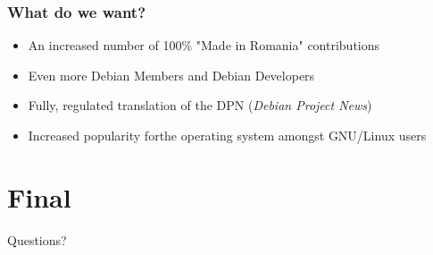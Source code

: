 \documentclass[xcolor=dvipsnames]{beamer}
\begin{document}
\begin{frame}
\frametitle{What do we want?}
\begin{itemize}
\item An increased number of 100\% "Made in Romania" contributions
\item Even more Debian Members and Debian Developers
\item Fully, regulated translation of the DPN (\emph{Debian Project News})
\item Increased popularity forthe operating system amongst GNU/Linux users
\end{itemize}
\end{frame}


\section{Final} 
\begin{frame}
\centerline{Questions?}
\end{frame}
\end{document}
